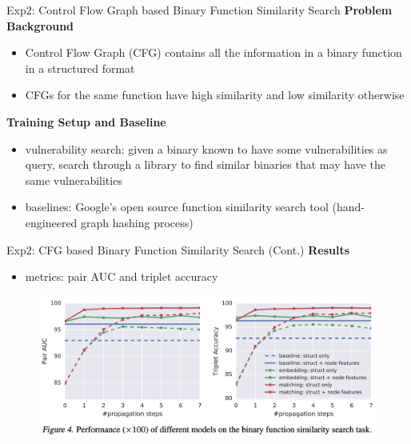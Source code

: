 \documentclass{beamer}
\begin{document}
\begin{frame}{Exp2: Control Flow Graph based Binary Function Similarity Search}
\textbf{Problem Background}
\begin{itemize}
    \item Control Flow Graph (CFG) contains all the information in a binary function in a structured format
    \item CFGs for the same function have high similarity and low similarity otherwise
\end{itemize}

\textbf{Training Setup and Baseline}
\begin{itemize}
    \item vulnerability search: given a binary known to have some vulnerabilities as query, search through a library to find similar binaries that may have the same vulnerabilities
    \item baselines: Google's open source function similarity search tool (hand-engineered graph hashing process)
\end{itemize}
\end{frame}

\begin{frame}{Exp2: CFG based Binary Function Similarity Search (Cont.)}
\textbf{Results}
\begin{itemize}
    \item metrics: pair AUC and triplet accuracy
\end{itemize}
\begin{figure}[h]
\centering
\includegraphics[height=0.4\textheight]{pic/GMN/gmn_fig4.png}
\end{figure}
\end{frame}
\end{document}
